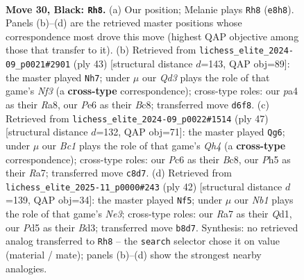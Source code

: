 \documentclass[11pt]{article}
\begin{document}
\clearpage

\begin{figure}[p]\centering
\begin{subfigure}{0.46\textwidth}\centering
\resizebox{\linewidth}{!}{%
\newchessgame
\chessboard[
  setfen={1nb1r3/rp4k1/2pqp3/p2p1p1p/Pn1P1P1N/2N3P1/1PPQB1KP/3R3R b - - 14 30},
  showmover=false,
  pgfstyle=straightmove, color=movearrow, markmove={e8-h8}
]}
\caption{}
\end{subfigure}\hfill
\begin{subfigure}{0.46\textwidth}\centering
\resizebox{\linewidth}{!}{%
\newchessgame
\chessboard[
  setfen={r1b2rk1/2p1qpp1/1p1p1n1p/3Pp2P/1PP1P1n1/2NB1N2/1K2QPP1/3R3R b - - 0 22},
  showmover=false,
  pgfstyle=straightmove, color=movearrow, markmove={f6-h7}
]}
\caption{}
\end{subfigure}
\\[4pt]
\begin{subfigure}{0.46\textwidth}\centering
\resizebox{\linewidth}{!}{%
\newchessgame
\chessboard[
  setfen={2b4r/r1p1npk1/p2p1n2/P3p2q/2B1P1pp/2PPN3/Q4PPP/1R2RNK1 b - - 10 24},
  showmover=false,
  pgfstyle=straightmove, color=movearrow, markmove={h5-g6}
]}
\caption{}
\end{subfigure}\hfill
\begin{subfigure}{0.46\textwidth}\centering
\resizebox{\linewidth}{!}{%
\newchessgame
\chessboard[
  setfen={r2qrn1k/p2b1pp1/1p1p3p/2pPp2n/P1P1P3/2PBNPP1/R6P/2BQR2K w - - 6 22},
  showmover=false,
  pgfstyle=straightmove, color=movearrow, markmove={e3-f5}
]}
\caption{}
\end{subfigure}
\caption{\textbf{Move 30, Black: \texttt{Rh8}.} (a) Our position; Melanie plays \texttt{Rh8} (\texttt{e8h8}). Panels (b)--(d) are the retrieved master positions whose correspondence most drove this move (highest QAP objective among those that transfer to it). (b) Retrieved from \texttt{lichess\_elite\_2024-09\_p0021\#2901} (ply 43) [structural distance $d$=143, QAP obj=89]: the master played \texttt{Nh7}; under $\mu$ our \emph{Qd3} plays the role of that game's \emph{Nf3} (a \textbf{cross-type} correspondence); cross-type roles: our \emph{p}a4 as their \emph{R}a8, our \emph{P}e6 as their \emph{B}c8; transferred move \texttt{d6f8}. (c) Retrieved from \texttt{lichess\_elite\_2024-09\_p0022\#1514} (ply 47) [structural distance $d$=132, QAP obj=71]: the master played \texttt{Qg6}; under $\mu$ our \emph{Bc1} plays the role of that game's \emph{Qh4} (a \textbf{cross-type} correspondence); cross-type roles: our \emph{P}c6 as their \emph{B}c8, our \emph{P}h5 as their \emph{R}a7; transferred move \texttt{c8d7}. (d) Retrieved from \texttt{lichess\_elite\_2025-11\_p0000\#243} (ply 42) [structural distance $d$=139, QAP obj=34]: the master played \texttt{Nf5}; under $\mu$ our \emph{Nb1} plays the role of that game's \emph{Ne3}; cross-type roles: our \emph{R}a7 as their \emph{Q}d1, our \emph{P}d5 as their \emph{B}d3; transferred move \texttt{b8d7}. Synthesis: no retrieved analog transferred to \texttt{Rh8} -- the \texttt{search} selector chose it on value (material / mate); panels (b)--(d) show the strongest nearby analogies.}
\label{fig:thought-m59}
\end{figure}
\end{document}
